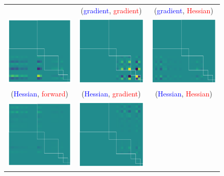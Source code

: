 \begin{figure}[t]
\begin{tabular}{ccc}
    &
      (\textcolor{blue}{gradient}, \textcolor{red}{gradient})
    &
      (\textcolor{blue}{gradient}, \textcolor{red}{Hessian})
    \\
    \includegraphics[width=0.22\linewidth]{../kfac_pinns_exp/exp04_gramian_contributions/fig/gram_grad_input_output.png}
    &
      \includegraphics[width=0.22\linewidth]{../kfac_pinns_exp/exp04_gramian_contributions/fig/gram_grad_input_grad_input.png}
    &
      \includegraphics[width=0.22\linewidth]{../kfac_pinns_exp/exp04_gramian_contributions/fig/gram_grad_input_hess_input.png}
    \\
    (\textcolor{blue}{Hessian}, \textcolor{red}{forward})
    &
      (\textcolor{blue}{Hessian}, \textcolor{red}{gradient})
    &
      (\textcolor{blue}{Hessian}, \textcolor{red}{Hessian})
    \\
    \includegraphics[width=0.22\linewidth]{../kfac_pinns_exp/exp04_gramian_contributions/fig/gram_hess_input_output.png}
    &
      \includegraphics[width=0.22\linewidth]{../kfac_pinns_exp/exp04_gramian_contributions/fig/gram_hess_input_grad_input.png}

\end{tabular}
\end{figure}
